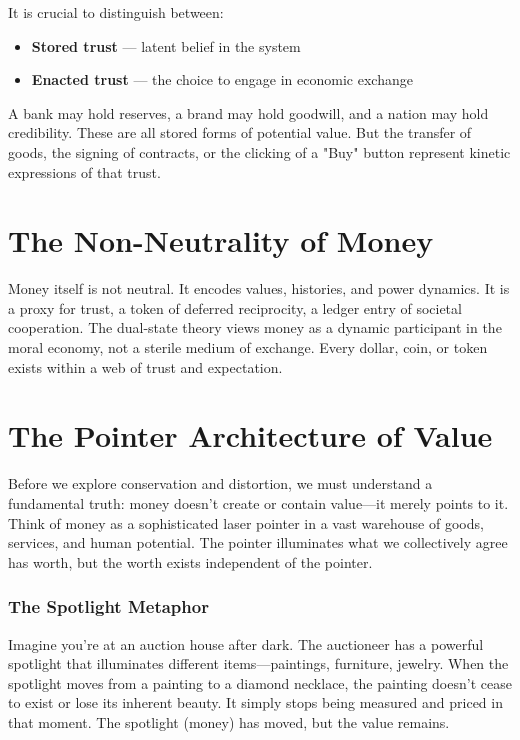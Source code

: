 \documentclass[11pt,oneside]{book}
\begin{document}
It is crucial to distinguish between:
\begin{itemize}
\item \textbf{Stored trust} — latent belief in the system
\item \textbf{Enacted trust} — the choice to engage in economic exchange
\end{itemize}

A bank may hold reserves, a brand may hold goodwill, and a nation may hold credibility. These are all stored forms of potential value. But the transfer of goods, the signing of contracts, or the clicking of a "Buy" button represent kinetic expressions of that trust.

\section{The Non-Neutrality of Money}

Money itself is not neutral. It encodes values, histories, and power dynamics. It is a proxy for trust, a token of deferred reciprocity, a ledger entry of societal cooperation. The dual-state theory views money as a dynamic participant in the moral economy, not a sterile medium of exchange. Every dollar, coin, or token exists within a web of trust and expectation.

\section{The Pointer Architecture of Value}

Before we explore conservation and distortion, we must understand a fundamental truth: money doesn't create or contain value—it merely points to it. Think of money as a sophisticated laser pointer in a vast warehouse of goods, services, and human potential. The pointer illuminates what we collectively agree has worth, but the worth exists independent of the pointer.

\subsubsection{The Spotlight Metaphor}

Imagine you're at an auction house after dark. The auctioneer has a powerful spotlight that illuminates different items—paintings, furniture, jewelry. When the spotlight moves from a painting to a diamond necklace, the painting doesn't cease to exist or lose its inherent beauty. It simply stops being measured and priced in that moment. The spotlight (money) has moved, but the value remains.
\end{document}
